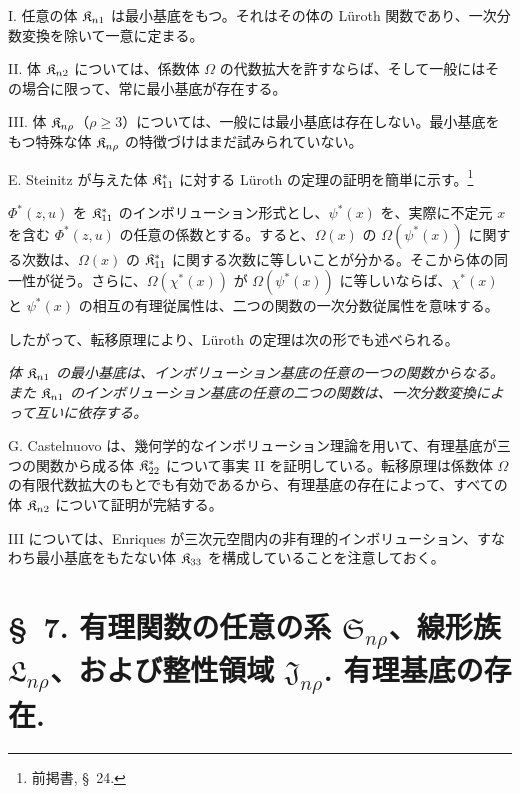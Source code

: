 \documentclass[11pt]{article}
\newcommand{\eps}{\varepsilon}
\begin{document}
I. 任意の体 $\Kfield_{n1}$ は最小基底をもつ。それはその体の Lüroth 関数であり、一次分数変換を除いて一意に定まる。

II. 体 $\Kfield_{n2}$ については、係数体 $\Omega$ の代数拡大を許すならば、そして一般にはその場合に限って、常に最小基底が存在する。

III. 体 $\Kfield_{n\rho}$（$\rho\ge3$）については、一般には最小基底は存在しない。最小基底をもつ特殊な体 $\Kfield_{n\rho}$ の特徴づけはまだ試みられていない。

E. Steinitz が与えた体 $\Kfield^*_{11}$ に対する Lüroth の定理の証明を簡単に示す。\footnote{前掲書, \S\ 24.}

$\Phi^*(z,u)$ を $\Kfield^*_{11}$ のインボリューション形式とし、$\psi^*(x)$ を、実際に不定元 $x$ を含む $\Phi^*(z,u)$ の任意の係数とする。すると、$\Omega(x)$ の $\Omega(\psi^*(x))$ に関する次数は、$\Omega(x)$ の $\Kfield^*_{11}$ に関する次数に等しいことが分かる。そこから体の同一性が従う。さらに、$\Omega(\chi^*(x))$ が $\Omega(\psi^*(x))$ に等しいならば、$\chi^*(x)$ と $\psi^*(x)$ の相互の有理従属性は、二つの関数の一次分数従属性を意味する。

したがって、転移原理により、Lüroth の定理は次の形でも述べられる。

\emph{体 $\Kfield_{n1}$ の最小基底は、インボリューション基底の任意の一つの関数からなる。また $\Kfield_{n1}$ のインボリューション基底の任意の二つの関数は、一次分数変換によって互いに依存する。}

G. Castelnuovo は、幾何学的なインボリューション理論を用いて、有理基底が三つの関数から成る体 $\Kfield^*_{22}$ について事実 II を証明している。転移原理は係数体 $\Omega$ の有限代数拡大のもとでも有効であるから、有理基底の存在によって、すべての体 $\Kfield_{n2}$ について証明が完結する。

III については、Enriques が三次元空間内の非有理的インボリューション、すなわち最小基底をもたない体 $\Kfield_{33}$ を構成していることを注意しておく。

\providecommand{\Kfield}{\mathfrak{K}}
\providecommand{\Ssys}{\mathfrak{S}}
\providecommand{\Jdom}{\mathfrak{J}}
\providecommand{\Gdom}{\mathfrak{G}}
\providecommand{\Lsys}{\mathfrak{L}}
\providecommand{\Omegaint}{[\Omega]}
\providecommand{\eps}{\varepsilon}

\section*{\S\ 7. 有理関数の任意の系 $\Ssys_{n\rho}$、線形族 $\Lsys_{n\rho}$、および整性領域 $\Jdom_{n\rho}$. 有理基底の存在.}
\end{document}
